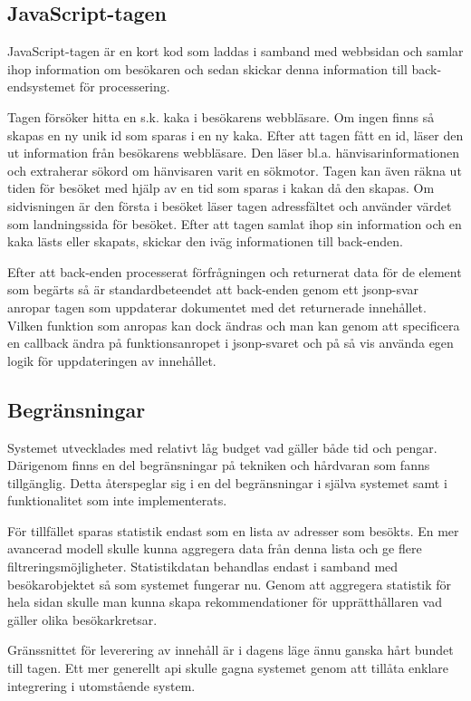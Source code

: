 \subsection{JavaScript-tagen}

JavaScript-tagen är en kort kod som laddas i samband med webbsidan och samlar ihop information om besökaren och sedan skickar denna information till back-endsystemet för processering.

Tagen försöker hitta en s.k. kaka i besökarens webbläsare. Om ingen finns så skapas en ny unik id som sparas i en ny kaka. Efter att tagen fått en id, läser den ut information från besökarens webbläsare. Den läser bl.a. hänvisarinformationen och extraherar sökord om hänvisaren varit en sökmotor. Tagen kan även räkna ut tiden för besöket med hjälp av en tid som sparas i kakan då den skapas. Om sidvisningen är den första i besöket läser tagen adressfältet och använder värdet som landningssida för besöket. Efter att tagen samlat ihop sin information och en kaka lästs eller skapats, skickar den iväg informationen till back-enden.

Efter att back-enden processerat förfrågningen och returnerat data för de element som begärts så är standardbeteendet att back-enden genom ett \gls{jsonp}-svar anropar tagen som uppdaterar dokumentet med det returnerade innehållet. Vilken funktion som anropas kan dock ändras och man kan genom att specificera en callback ändra på funktionsanropet i \gls{jsonp}-svaret och på så vis använda egen logik för uppdateringen av innehållet.

\subsection{Begränsningar}

Systemet utvecklades med relativt låg budget vad gäller både tid och pengar. Därigenom finns en del begränsningar på tekniken och hårdvaran som fanns tillgänglig. Detta återspeglar sig i en del begränsningar i själva systemet samt i funktionalitet som inte implementerats.

För tillfället sparas statistik endast som en lista av adresser som besökts. En mer avancerad modell skulle kunna aggregera data från denna lista och ge flere filtreringsmöjligheter. Statistikdatan behandlas endast i samband med besökarobjektet så som systemet fungerar nu. Genom att aggregera statistik för hela sidan skulle man kunna skapa rekommendationer för upprätthållaren vad gäller olika besökarkretsar.

Gränssnittet för leverering av innehåll är i dagens läge ännu ganska hårt bundet till tagen. Ett mer generellt \acrshort{api} skulle gagna systemet genom att tillåta enklare integrering i utomstående system.

